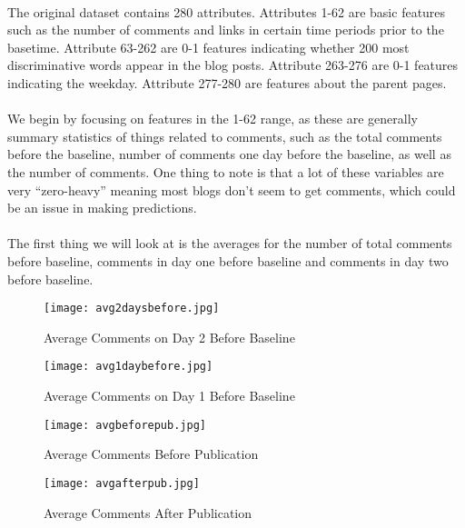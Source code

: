 \documentclass[paper=a4, fontsize=11pt]{scrartcl} %
\numberwithin{equation}{section} %
\numberwithin{figure}{section} %
\numberwithin{table}{section} %
\begin{document}
\paragraph{}
The original dataset contains 280 attributes. Attributes 1-62 are basic features
such as the number of comments and links in certain time periods prior
to the basetime. Attribute 63-262 are 0-1 features indicating whether 200 most
discriminative words appear in the blog posts. Attribute 263-276 are 0-1 features
indicating the weekday. Attribute 277-280 are features about the parent pages.

\paragraph{}
We begin by focusing on features in the 1-62 range, as these are generally summary statistics of things related to comments, such as the total comments before the baseline, number of comments one day before the baseline, as well as the number of comments. One thing to note is that a lot of these variables are very ``zero-heavy'' meaning most blogs don't seem to get comments, which could be an issue in making predictions.

\paragraph{}
The first thing we will look at is the averages for the number of total comments before baseline, comments in day one before baseline and comments in day two before baseline.

\graphicspath{{/Users/stevenhurwitt/Documents/Illinois/Stat542/FINAL/}} %

\begin{figure}[H]
    \centering
    \begin{minipage}{0.45\textwidth}
        \centering
        \texttt{[image: avg2daysbefore.jpg]} 
        \caption{Average Comments on Day 2 Before Baseline}
    \end{minipage}\hfill
    \begin{minipage}{0.45\textwidth}
        \centering
        \texttt{[image: avg1daybefore.jpg]} 
        \caption{Average Comments on Day 1 Before Baseline}
    \end{minipage}
\end{figure}

\begin{figure}[H]
    \centering
    \begin{minipage}{0.45\textwidth}
        \centering
        \texttt{[image: avgbeforepub.jpg]} 
        \caption{Average Comments Before Publication}
    \end{minipage}\hfill
    \begin{minipage}{0.45\textwidth}
        \centering
        \texttt{[image: avgafterpub.jpg]} 
        \caption{Average Comments After Publication}
    \end{minipage}
\end{figure}
\end{document}
